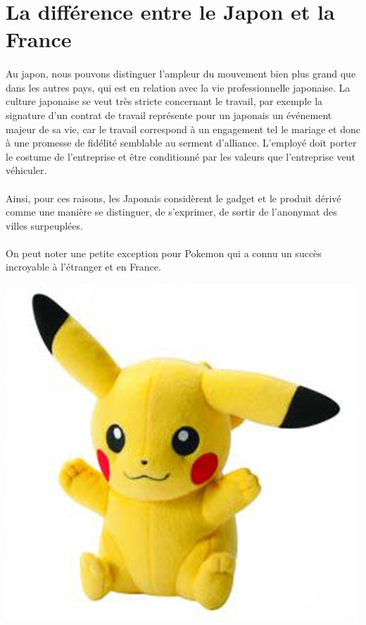 \section{La différence entre le Japon et la France}

\paragraph{} Au japon, nous pouvons distinguer l'ampleur du mouvement bien plus
grand que dans les autres pays, qui est en relation avec la vie professionnelle
japonaise. La culture japonaise se veut très stricte concernant le travail, par
exemple la signature d'un contrat de travail représente pour un japonais un
événement majeur de sa vie, car le travail correspond à un engagement tel le
mariage et donc à une promesse de fidélité semblable au serment d'alliance.
L'employé doit porter le costume de l'entreprise et être conditionné par les
valeurs que l'entreprise veut véhiculer.

\paragraph{} Ainsi, pour ces raisons, les Japonais considèrent le gadget et le
produit dérivé comme une manière se distinguer, de s'exprimer, de sortir de
l'anonymat des villes surpeuplées.

\paragraph{} On peut noter une petite exception pour Pokemon qui a connu un
succès incroyable à l'étranger et en France.

\begin{center}
	\includegraphics[scale=0.15]{pokemon.jpg}
\end{center}

